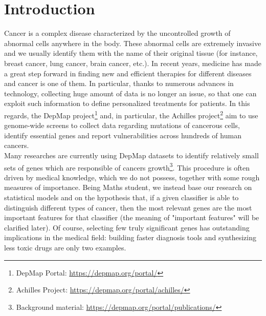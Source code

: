 \documentclass[a4paper,11pt, oneside]{article}  %
\begin{document}
\section{Introduction}
Cancer is a complex disease characterized by the uncontrolled growth of abnormal cells anywhere in the body. These abnormal cells are extremely invasive and we usually identify them with the name of their original tissue (for instance, breast cancer, lung cancer,  brain cancer, etc.).  In recent years, medicine has made a great step forward in finding new and efficient therapies for different diseases and cancer is one of them.  In particular,  thanks to numerous advances in technology,  collecting huge amount of data is no longer an issue, so that one can exploit such information to define personalized treatments for patients. In this regards, the DepMap project\footnote{DepMap Portal: \url{https://depmap.org/portal/} } and,  in particular,  the Achilles project\footnote{Achilles Project: \url{https://depmap.org/portal/achilles/} } aim to use genome-wide screens to collect data regarding mutations of cancerous cells,  identify essential genes and report vulnerabilities across hundreds of human cancers.  \\
 
Many researches are currently using DepMap datasets to identify relatively small sets of genes which are responsible of cancers growth\footnote{Background material: \url{https://depmap.org/portal/publications/}}. This procedure is often driven by medical knowledge,  which we do not possess,  together with some rough measures of importance.  Being Maths student,  we instead base our research on statistical models and on the hypothesis that, if a given classifier is able to distinguish different types of cancer, then the most relevant genes are the most important features for that classifier (the meaning of "important features" will be clarified later).  Of course,  selecting few truly significant genes has outstanding implications in the medical field: building faster diagnosis tools and synthesizing less toxic drugs are only two examples. 
\end{document}
